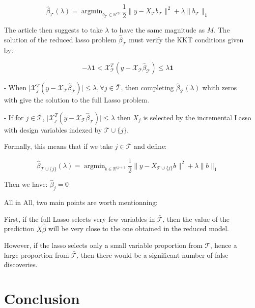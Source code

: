 \documentclass[10pt,onecolumn,letterpaper]{article}
\DeclareMathOperator*{\argmin}{argmin}
\begin{document}
$$
\hat{\beta}_{\mathcal{T}}(\lambda) = \argmin_{b_{\mathcal{T}} \in \mathbb{R}^{\epsilon p}}  \frac{1}{2}\lVert y - X_{\mathcal{T}}b_{\mathcal{T}} \rVert^2 + \lambda \lVert b_{\mathcal{T}} \rVert_1 
$$

The article then suggests to take $\lambda$ to have the same magnitude as $M$. The solution of the reduced lasso problem $\hat{\beta}_{\mathcal{T}}$ must verify the KKT conditions given by: 

$$
- \lambda \boldsymbol{1} < \mathcal{X}_{\mathcal{T}}^T(y - \mathcal{X}_{\mathcal{T}} \hat{\beta}_{\mathcal{T}}) \leq \lambda \boldsymbol{1}
$$

- When $\vert \mathcal{X}_{j}^T(y - \mathcal{X}_{\mathcal{T}} \hat{\beta}_{\mathcal{T}}) \vert \leq \lambda, \forall j \in \bar{\mathcal{T}} $, then completing $\hat{\beta}_{\mathcal{T}}(\lambda)$ whith zeros with give the solution to the full Lasso problem. 
\newline 

- If for $ j \in \bar{\mathcal{T}}$, $\vert \mathcal{X}_{j}^T(y - \mathcal{X}_{\mathcal{T}} \hat{\beta}_{\mathcal{T}}) \vert \leq \lambda $ then $X_j$ is selected by the incremental Lasso with design variables indexed by $\mathcal{T} \cup \{j\}$. 

Formally, this means that if we take $j \in \bar{\mathcal{T}}$ and define:

$$
\hat{\beta}_{\mathcal{T} \cup \{j\}}(\lambda) = \argmin_{b \in \mathbb{R}^{\epsilon p + 1}}  \frac{1}{2}\lVert y - X_{\mathcal{T} \cup \{j\}}b \rVert^2 + \lambda \lVert b \rVert_1 
$$

Then we have: $\hat{\beta}_j = 0$
\newline

All in All, two main points are worth mentionning:
\newline

First, if the full Lasso selects very few variables in $\bar{\mathcal{T}}$, then the value of the prediction $X\hat{\beta}$ will be very close to the one obtained in the reduced model.  

However, if the lasso selects only a small variable proportion from $\mathcal{T}$, hence a large proportion from $\bar{\mathcal{T}}$, then there would be a significant number of false discoveries. 

\section{Conclusion}

 


{\small


}
\end{document}
